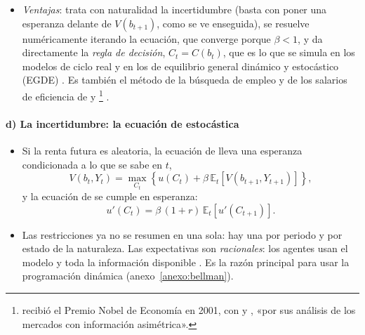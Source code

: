 \documentclass[11pt]{article}
\begin{document}
\begin{itemize}
\begin{itemize}
  \item sustituyendo en la ecuación de  e igualando los coeficientes de $\ln b_t$ a los 2~lados, $B=1+\beta B$, es decir, $B=1/(1-\beta)$;
  \item luego
    \begin{equation*}
    C_t=(1-\beta)(1+r)\,b_t,\qquad b_{t+1}=\beta(1+r)\,b_t:
    \end{equation*}
    cada periodo se consume una fracción fija, $1-\beta$, de la riqueza, y la riqueza y el consumo crecen a la tasa $\beta(1+r)$, que es lo que dice la ecuación de  con utilidad logarítmica. Con $r=\rho$, $\beta(1+r)=1$ y el consumo es constante. La fracción no depende de $r$: con utilidad logarítmica, los efectos renta y sustitución de un cambio del tipo de interés se compensan exactamente.
  \end{itemize}
\item \emph{Ventajas}: trata con naturalidad la incertidumbre (basta con poner una esperanza delante de $V(b_{t+1})$, como se ve enseguida), se resuelve numéricamente iterando la ecuación, que converge porque $\beta<1$\nocite{StokeyLucas1989Recursive,LjungqvistSargent2018Recursive}, y da directamente la \emph{regla de decisión}, $C_t=C(b_t)$, que es lo que se simula en los modelos de ciclo real y en los de equilibrio general dinámico y estocástico (EGDE) . Es también el método de la búsqueda de empleo  y de los salarios de eficiencia de  y \footnote{ recibió el Premio Nobel de Economía en 2001, con  y , «por sus análisis de los mercados con información asimétrica»\nocite{Nobel2001AkerlofSpenceStiglitz}.} .
\end{itemize}

\paragraph{d) La incertidumbre: la ecuación de  estocástica}

\begin{itemize}
\item Si la renta futura es aleatoria, la ecuación de  lleva una esperanza condicionada a lo que se sabe en $t$,
  \begin{equation*}
  V(b_t,Y_t)=\max_{C_t}\left\{u(C_t)+\beta\,\mathbb{E}_t\!\left[V(b_{t+1},Y_{t+1})\right]\right\},
  \end{equation*}
  y la ecuación de  se cumple en esperanza:
  \begin{equation}
  u'(C_t)=\beta\,(1+r)\,\mathbb{E}_t\!\left[u'(C_{t+1})\right].\label{eq:euler-estocastica}
  \end{equation}
\item Las restricciones ya no se resumen en una sola: hay una por periodo y por estado de la naturaleza. Las expectativas son \emph{racionales}: los agentes usan el modelo y toda la información disponible . Es la razón principal para usar la programación dinámica (anexo~\ref{anexo:bellman}).
\end{itemize}
\end{document}
